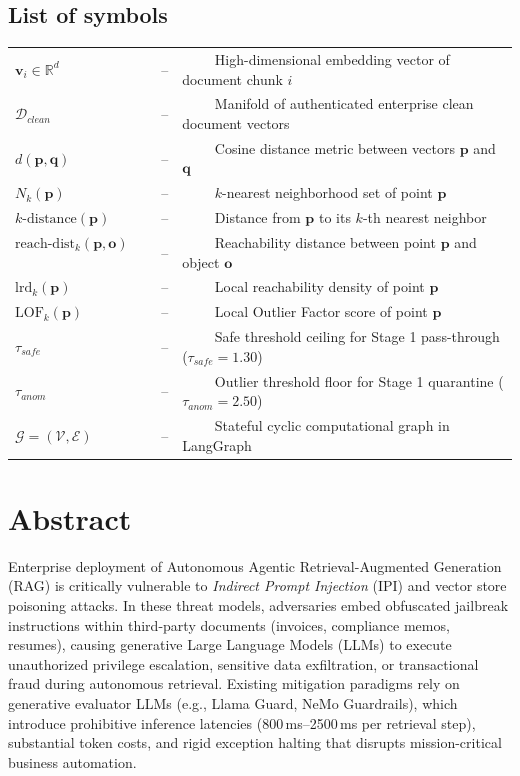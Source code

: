 \documentclass[a4paper, 12pt]{report}
\theoremstyle{definition}
\begin{document}
\section*{{\huge List of symbols}\hfill} 
\vspace{1.2cm}
\begin{tabular}{lll}
$\mathbf{v}_i \in \mathbb{R}^d$ ~~~~&--&~~~~ High-dimensional embedding vector of document chunk $i$ \\
$\mathcal{D}_{clean}$ ~~~~&--&~~~~ Manifold of authenticated enterprise clean document vectors \\
$d(\mathbf{p}, \mathbf{q})$ ~~~~&--&~~~~ Cosine distance metric between vectors $\mathbf{p}$ and $\mathbf{q}$ \\
$N_k(\mathbf{p})$ ~~~~&--&~~~~ $k$-nearest neighborhood set of point $\mathbf{p}$ \\
$k\text{-distance}(\mathbf{p})$ ~~~~&--&~~~~ Distance from $\mathbf{p}$ to its $k$-th nearest neighbor \\
$\text{reach-dist}_k(\mathbf{p}, \mathbf{o})$ ~~~~&--&~~~~ Reachability distance between point $\mathbf{p}$ and object $\mathbf{o}$ \\
$\text{lrd}_k(\mathbf{p})$ ~~~~&--&~~~~ Local reachability density of point $\mathbf{p}$ \\
$\text{LOF}_k(\mathbf{p})$ ~~~~&--&~~~~ Local Outlier Factor score of point $\mathbf{p}$ \\
$\tau_{safe}$ ~~~~&--&~~~~ Safe threshold ceiling for Stage 1 pass-through ($\tau_{safe} = 1.30$) \\
$\tau_{anom}$ ~~~~&--&~~~~ Outlier threshold floor for Stage 1 quarantine ($\tau_{anom} = 2.50$) \\
$\mathcal{G} = (\mathcal{V}, \mathcal{E})$ ~~~~&--&~~~~ Stateful cyclic computational graph in LangGraph \\
\end{tabular}
\newpage

\chapter*{Abstract}
Enterprise deployment of Autonomous Agentic Retrieval-Augmented Generation (RAG) is critically vulnerable to \textit{Indirect Prompt Injection} (IPI) and vector store poisoning attacks. In these threat models, adversaries embed obfuscated jailbreak instructions within third-party documents (invoices, compliance memos, resumes), causing generative Large Language Models (LLMs) to execute unauthorized privilege escalation, sensitive data exfiltration, or transactional fraud during autonomous retrieval. Existing mitigation paradigms rely on generative evaluator LLMs (e.g., Llama Guard, NeMo Guardrails), which introduce prohibitive inference latencies (800\,ms--2500\,ms per retrieval step), substantial token costs, and rigid exception halting that disrupts mission-critical business automation.
\end{document}
